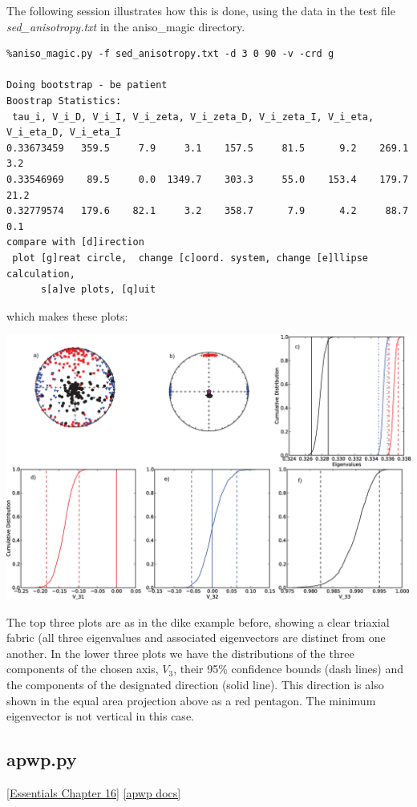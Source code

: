 \documentclass[11pt]{book}
\begin{document}
{{The following session illustrates how this is done, using the data in the test file {\it sed\_anisotropy.txt} in the aniso\_magic directory.

\begin{verbatim}
%aniso_magic.py -f sed_anisotropy.txt -d 3 0 90 -v -crd g

Doing bootstrap - be patient
Boostrap Statistics: 
 tau_i, V_i_D, V_i_I, V_i_zeta, V_i_zeta_D, V_i_zeta_I, V_i_eta, V_i_eta_D, V_i_eta_I
0.33673459   359.5     7.9     3.1    157.5     81.5      9.2    269.1      3.2 
0.33546969    89.5     0.0  1349.7    303.3     55.0    153.4    179.7     21.2 
0.32779574   179.6    82.1     3.2    358.7      7.9      4.2     88.7      0.1 
compare with [d]irection 
 plot [g]reat circle,  change [c]oord. system, change [e]llipse calculation,  
      s[a]ve plots, [q]uit 
 \end{verbatim}
 
 which makes these plots:
 
   \includegraphics[width=15cm]{EPSfiles/sed-aniso.eps}
   
   The top three plots are as in the dike example before, showing a clear triaxial fabric (all three eigenvalues and associated eigenvectors are distinct from one another.  In the lower three plots we have the distributions of the three components of the chosen axis,  $V_3$, their 95\% confidence bounds (dash lines) and the components of the designated direction (solid line).  This direction is also shown in the equal area projection above as a red pentagon.  The minimum eigenvector is not vertical in this case.    
 


\subsection{apwp.py }
\href{http://magician.ucsd.edu/Essentials_2/WebBook2ch16.html#ch16}{[Essentials Chapter 16]}
\href{http://earthref.org/PmagPy/pmagpydocs/apwp-module.html}{[apwp docs]}

}}
\end{document}
